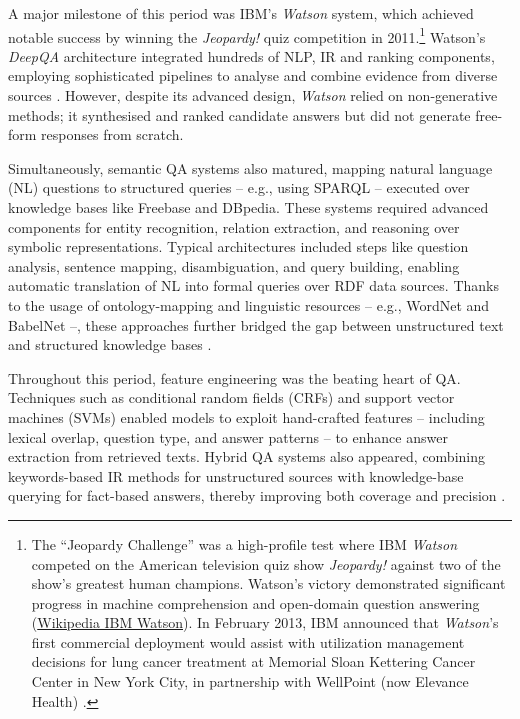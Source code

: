 \begin{spacing}{1.5}
A major milestone of this period was IBM's \textit{Watson} system, which achieved notable success by winning the \textit{Jeopardy!} quiz competition in 2011.\footnote{The ``Jeopardy Challenge'' was a high-profile test where IBM \textit{Watson} competed on the American television quiz show \textit{Jeopardy!} against two of the show's greatest human champions. Watson’s victory demonstrated significant progress in machine comprehension and open-domain question answering (\href{https://en.wikipedia.org/w/index.php?title=IBM_Watson&oldid=1301611671}{Wikipedia IBM Watson}). In February 2013, IBM announced that \textit{Watson}'s first commercial deployment would assist with utilization management decisions for lung cancer treatment at Memorial Sloan Kettering Cancer Center in New York City, in partnership with WellPoint (now Elevance Health) \citep{upbin_ibms_2013}.} Watson’s \textit{DeepQA} architecture integrated hundreds of NLP, IR and ranking components, employing sophisticated pipelines to analyse and combine evidence from diverse sources \citep{ferrucci_building_2011}. However, despite its advanced design, \textit{Watson} relied on non-generative methods; it synthesised and ranked candidate answers but did not generate free-form responses from scratch.

Simultaneously, semantic QA systems also matured, mapping natural language (NL) questions to structured queries  -- e.g., using SPARQL -- executed over knowledge bases like Freebase and DBpedia. These systems required advanced components for entity recognition, relation extraction, and reasoning over symbolic representations. Typical architectures included steps like question analysis, sentence mapping, disambiguation, and query building, enabling automatic translation of NL into formal queries over RDF data sources. Thanks to the usage of ontology-mapping and linguistic resources -- e.g., WordNet \citep{miller_wordnet_1992} and BabelNet \citep{navigli_ten_2021} --, these approaches further bridged the gap between unstructured text and structured knowledge bases \citep{franco_ontology-based_2020}.

Throughout this period, feature engineering was the beating heart of QA. Techniques such as conditional random fields (CRFs) and support vector machines (SVMs) enabled models to exploit hand-crafted features -- including lexical overlap, question type, and answer patterns -- to enhance answer extraction from retrieved texts. Hybrid QA systems also appeared, combining keywords-based IR methods for unstructured sources with knowledge-base querying for fact-based answers, thereby improving both coverage and precision \citep{antoniou_survey_2022}.


\end{spacing}
